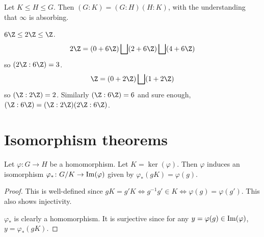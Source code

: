 \begin{corollary} \label{thm:index:mult}
    Let $K \le H \le G$.
    Then $(G : K) = (G : H)(H : K)$,
    with the understanding that $\infty$ is absorbing.
\end{corollary}
\begin{example}
    $6\Z \le 2\Z \le \Z$.
    \[
        2\Z = (0 + 6\Z) \bigsqcup (2 + 6\Z) \bigsqcup (4 + 6\Z)
    \] so $(2\Z : 6\Z) = 3$.
    \[
        \Z = (0 + 2\Z) \bigsqcup (1 + 2\Z)
    \] so $(\Z : 2\Z) = 2$.
    Similarly $(\Z : 6\Z) = 6$
    and sure enough, $(\Z : 6\Z) = (\Z : 2\Z)(2\Z : 6\Z)$.
\end{example}

\section{Isomorphism theorems} \label{sec:iso-thm}
\begin{theorem} \label{thm:iso:1}
    Let $\varphi\colon G \to H$ be a homomorphism.
    Let $K = \ker(\varphi)$.
    Then $\varphi$ induces an isomorphism
    $\varphi_*\colon G/K \to \operatorname{Im}(\varphi)$
    given by $\varphi_*(gK) = \varphi(g)$.
\end{theorem}
\begin{proof}
    This is well-defined since
    $gK = g'K \iff g^{-1}g' \in K \iff \varphi(g) = \varphi(g')$.
    This also shows injectivity.

    $\varphi_*$ is clearly a homomorphism.
    It is surjective since for any $y = \varphi(g) \in \operatorname{Im}(\varphi)$,
    $y = \varphi_*(gK)$.
\end{proof}

